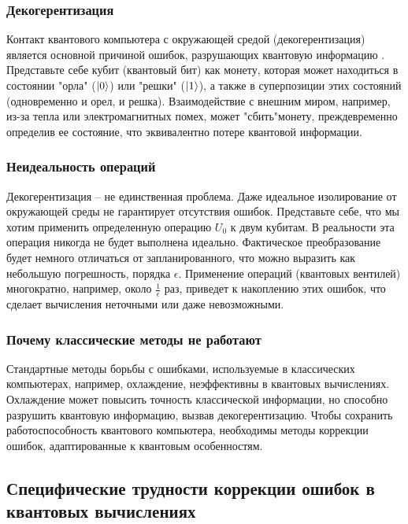 \documentclass[12pt,a4paper]{article}
\begin{document}
	\subsubsection{Декогерентизация}
	
	Контакт квантового компьютера с окружающей средой (декогерентизация) является основной причиной ошибок, разрушающих квантовую информацию \cite{Preskill}. Представьте себе кубит (квантовый бит) как монету, которая может находиться в состоянии "орла" (\(\ket{0}\)) или "решки" (\(\ket{1}\)), а также в суперпозиции этих состояний (одновременно и орел, и решка). Взаимодействие с внешним миром, например, из-за тепла или электромагнитных помех, может "сбить"\quad  монету, преждевременно определив ее состояние, что эквивалентно потере квантовой информации.
	
	\subsubsection{Неидеальность операций}
	
	Декогерентизация – не единственная проблема. Даже идеальное изолирование от окружающей среды не гарантирует отсутствия ошибок. Представьте себе, что мы хотим применить определенную операцию \(U_0\) к двум кубитам. В реальности эта операция никогда не будет выполнена идеально. Фактическое преобразование будет немного отличаться от запланированного, что можно выразить как небольшую погрешность, порядка \(\epsilon\). Применение операций (квантовых вентилей) многократно, например, около \(\frac{1}{\epsilon}\) раз, приведет к накоплению этих ошибок, что сделает вычисления неточными или даже невозможными.
	
	\subsubsection{Почему классические методы не работают}
	
	Стандартные методы борьбы с ошибками, используемые в классических компьютерах, например, охлаждение, неэффективны в квантовых вычислениях. Охлаждение может повысить точность классической информации, но способно разрушить квантовую информацию, вызвав декогерентизацию. Чтобы сохранить работоспособность квантового компьютера, необходимы методы коррекции ошибок, адаптированные к квантовым особенностям.
	
	\subsection{Специфические трудности коррекции ошибок в квантовых вычислениях}
	
\end{document}
